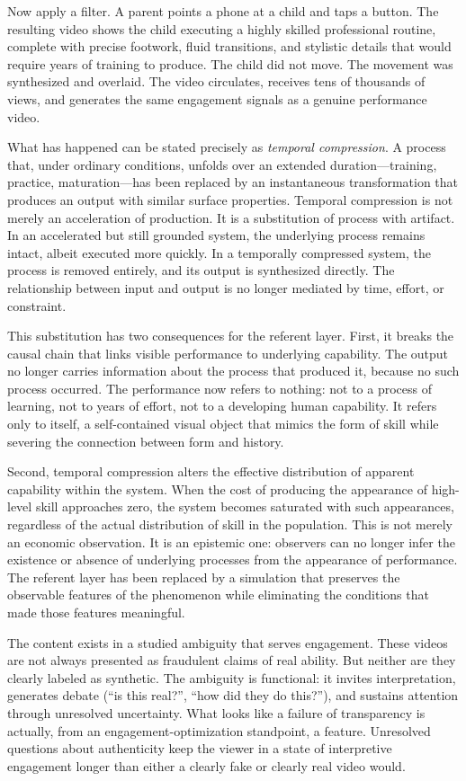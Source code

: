 \documentclass[12pt, a4paper]{article}
\begin{document}
Now apply a filter. A parent points a phone at a child and taps a button. The resulting video shows the child executing a highly skilled professional routine, complete with precise footwork, fluid transitions, and stylistic details that would require years of training to produce. The child did not move. The movement was synthesized and overlaid. The video circulates, receives tens of thousands of views, and generates the same engagement signals as a genuine performance video.

What has happened can be stated precisely as \textit{temporal compression}. A process that, under ordinary conditions, unfolds over an extended duration---training, practice, maturation---has been replaced by an instantaneous transformation that produces an output with similar surface properties. Temporal compression is not merely an acceleration of production. It is a substitution of process with artifact. In an accelerated but still grounded system, the underlying process remains intact, albeit executed more quickly. In a temporally compressed system, the process is removed entirely, and its output is synthesized directly. The relationship between input and output is no longer mediated by time, effort, or constraint.

This substitution has two consequences for the referent layer. First, it breaks the causal chain that links visible performance to underlying capability. The output no longer carries information about the process that produced it, because no such process occurred. The performance now refers to nothing: not to a process of learning, not to years of effort, not to a developing human capability. It refers only to itself, a self-contained visual object that mimics the form of skill while severing the connection between form and history.

Second, temporal compression alters the effective distribution of apparent capability within the system. When the cost of producing the appearance of high-level skill approaches zero, the system becomes saturated with such appearances, regardless of the actual distribution of skill in the population. This is not merely an economic observation. It is an epistemic one: observers can no longer infer the existence or absence of underlying processes from the appearance of performance. The referent layer has been replaced by a simulation that preserves the observable features of the phenomenon while eliminating the conditions that made those features meaningful.

The content exists in a studied ambiguity that serves engagement. These videos are not always presented as fraudulent claims of real ability. But neither are they clearly labeled as synthetic. The ambiguity is functional: it invites interpretation, generates debate (``is this real?'', ``how did they do this?''), and sustains attention through unresolved uncertainty. What looks like a failure of transparency is actually, from an engagement-optimization standpoint, a feature. Unresolved questions about authenticity keep the viewer in a state of interpretive engagement longer than either a clearly fake or clearly real video would.
\end{document}
